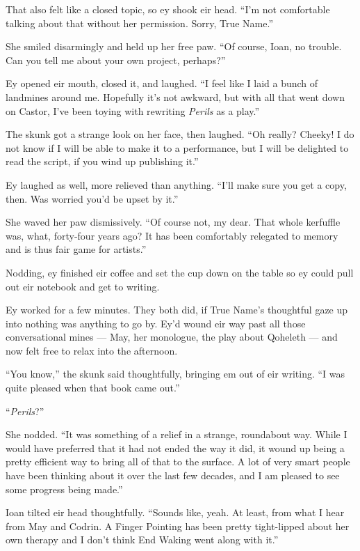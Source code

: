 That also felt like a closed topic, so ey shook eir head. ``I'm not comfortable talking about that without her permission. Sorry, True Name.''

She smiled disarmingly and held up her free paw. ``Of course, Ioan, no trouble. Can you tell me about your own project, perhaps?''

Ey opened eir mouth, closed it, and laughed. ``I feel like I laid a bunch of landmines around me. Hopefully it's not awkward, but with all that went down on Castor, I've been toying with rewriting \emph{Perils} as a play.''

The skunk got a strange look on her face, then laughed. ``Oh really? Cheeky! I do not know if I will be able to make it to a performance, but I will be delighted to read the script, if you wind up publishing it.''

Ey laughed as well, more relieved than anything. ``I'll make sure you get a copy, then. Was worried you'd be upset by it.''

She waved her paw dismissively. ``Of course not, my dear. That whole kerfuffle was, what, forty-four years ago? It has been comfortably relegated to memory and is thus fair game for artists.''

Nodding, ey finished eir coffee and set the cup down on the table so ey could pull out eir notebook and get to writing.

Ey worked for a few minutes. They both did, if True Name's thoughtful gaze up into nothing was anything to go by. Ey'd wound eir way past all those conversational mines — May, her monologue, the play about Qoheleth — and now felt free to relax into the afternoon.

``You know,'' the skunk said thoughtfully, bringing em out of eir writing. ``I was quite pleased when that book came out.''

``\emph{Perils}?''

She nodded. ``It was something of a relief in a strange, roundabout way. While I would have preferred that it had not ended the way it did, it wound up being a pretty efficient way to bring all of that to the surface. A lot of very smart people have been thinking about it over the last few decades, and I am pleased to see some progress being made.''

Ioan tilted eir head thoughtfully. ``Sounds like, yeah. At least, from what I hear from May and Codrin. A Finger Pointing has been pretty tight-lipped about her own therapy and I don't think End Waking went along with it.''


